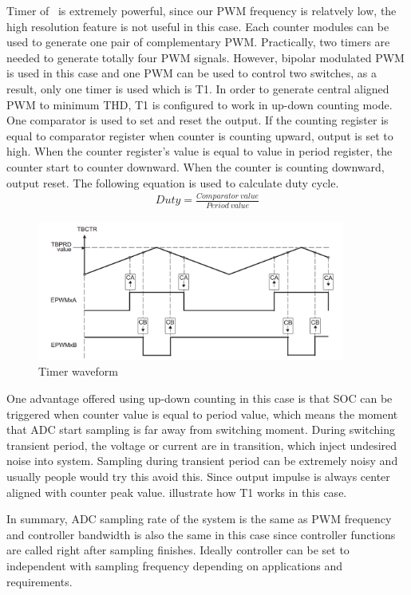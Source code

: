 Timer of \tms~is extremely powerful, since our \gls{PWM} frequency is relatvely low, the high resolution feature is not useful in this case. Each counter modules can be used to generate one pair of complementary \gls{PWM}. Practically, two timers are needed to generate totally four \gls{PWM} signals. However, bipolar modulated \gls{PWM} is used in this case and one \gls{PWM} can be used to control two switches, as a result, only one timer is used which is T1. In order to generate central aligned \gls{PWM} to minimum THD, T1 is configured to work in up-down counting mode. One comparator is used to set and reset the output. If the counting register is equal to comparator register when counter is counting upward, output is set to high. When the counter register's value is equal to value in period register, the counter start to counter downward. When the counter is counting downward, output reset. The following equation is used to calculate duty cycle. 
\begin{align}
    Duty = \frac{Comparator\ value}{Period\ value}
\end{align} 
\begin{figure}[b]
     \centering
     \includegraphics[width = 0.9\textwidth]{figures/timer_wave}
     \caption{Timer waveform}
     \label{fig:timer_wave}
\end{figure}
One advantage offered using up-down counting in this case is that SOC can be triggered when counter value is equal to period value, which means the moment that ADC start sampling is far away from switching moment. During switching transient period, the voltage or current are in transition, which inject undesired noise into system. Sampling during transient period can be extremely noisy and usually people would try this avoid this. Since output impulse is always center aligned with counter peak value.  illustrate how T1 works in this case. 

In summary, ADC sampling rate of the system is the same as \gls{PWM} frequency and controller bandwidth is also the same in this case since controller functions are called right after sampling finishes. Ideally controller can be set to independent with sampling frequency depending on applications and requirements.
